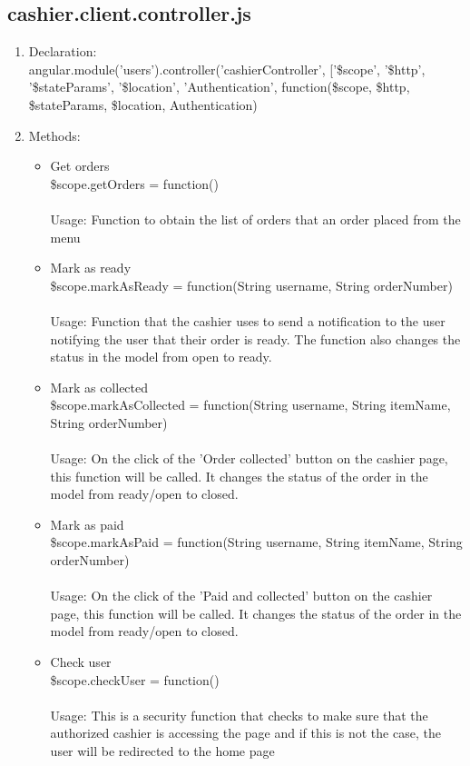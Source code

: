 \documentclass[a4paper,12pt]{report}
\begin{document}
\subsection{cashier.client.controller.js}
\begin{enumerate}
\item Declaration: \\ angular.module('users').controller('cashierController', ['\$scope', '\$http', '\$stateParams', '\$location', 'Authentication',
	function(\$scope, \$http, \$stateParams, \$location, Authentication) 
\item Methods:
	\begin{itemize}
		\item Get orders \\ \$scope.getOrders = function()
		\\ \\ Usage: Function to obtain the list of orders that an order placed from the menu 
		\item Mark as ready \\ \$scope.markAsReady = function(String username, String orderNumber) 
		\\ \\ Usage: Function that the cashier uses to send a notification to the user notifying the user that their order is ready. The function also changes the status in the model from open to ready.
	\item Mark as collected \\ \$scope.markAsCollected = function(String username, String itemName, String orderNumber) 
	\\ \\ Usage: On the click of the 'Order collected' button on the cashier page, this function will be called. It changes the status of the order in the model from ready/open to closed.
	\item Mark as paid \\ \$scope.markAsPaid = function(String username, String itemName, String orderNumber)  
	\\ \\ Usage: On the click of the 'Paid and collected' button on the cashier page, this function will be called. It changes the status of the order in the model from ready/open to closed.
	\item Check user \\ \$scope.checkUser = function() 
	\\ \\ Usage: This is a security function that checks to make sure that the authorized cashier is accessing the page and if this is not the case, the user will be redirected to the home page
	\end{itemize}	
\end{enumerate}
\end{document}
